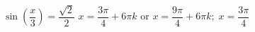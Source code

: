 { $\sin \left( \dfrac{x}{3} \right) = \dfrac{\sqrt{2}}{2}$}
{ $x = \dfrac{3\pi}{4} + 6\pi k$ or $x = \dfrac{9\pi}{4} + 6\pi k; \; x = \dfrac{3\pi}{4}$}
